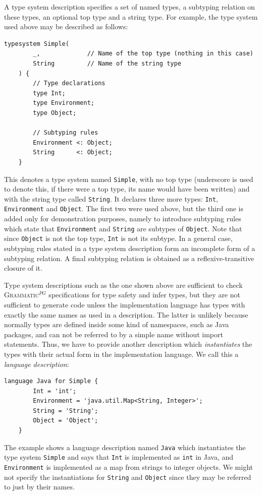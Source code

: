 \documentclass{informat} %
\newcommand{\ATF}{\textsc{Grammatic}$^{PG}$}
\begin{document}
A type system description specifies a set of named types, a subtyping relation on these types, an optional top type and a string type. For example, the type system used above may be described as follows:
\begin{lstlisting}[language=Typesystem]
	typesystem Simple( 
		_,             // Name of the top type (nothing in this case)
		String         // Name of the string type
	) {
		// Type declarations
		type Int;
		type Environment;
		type Object;

		// Subtyping rules
		Environment <: Object;
		String      <: Object;
	}
\end{lstlisting}
This denotes a type system named \texttt{Simple}, with no top type (underscore is used to denote this, if there were a top type, its name would have been written) and with the string type called \texttt{String}. It declares three more types: \texttt{Int}, \texttt{Environment} and \texttt{Object}. The first two were used above, but the third one is added only for demonstration purposes, namely to introduce subtyping rules which state that \texttt{Environment} and \texttt{String} are subtypes of \texttt{Object}. Note that since \texttt{Object} is not the top type, \texttt{Int} is not its subtype. In a general case, subtyping rules stated in a type system description form an incomplete form of a subtyping relation. A final subtyping relation is obtained as a reflexive-transitive closure of it.

Type system descriptions such as the one shown above are sufficient to check \ATF{} specifications for type safety and infer types, but they are not sufficient to generate code unless the implementation language has types with exactly the same names as used in a description. The latter is unlikely because normally types are defined inside some kind of namespaces, such as Java packages, and can not be referred to by a simple name without import statements. Thus, we have to provide another description which \emph{instantiates} the types with their actual form in the implementation language. We call this a \emph{language description}:
\begin{lstlisting}[language=Typesystem]
	language Java for Simple {
		Int = 'int';
		Environment = 'java.util.Map<String, Integer>';
		String = 'String';
		Object = 'Object';
	}
\end{lstlisting}
The example shows a language description named \texttt{Java} which instantiates the type system \texttt{Simple} and says that \texttt{Int} is implemented as \texttt{int} in Java, and \texttt{Environment} is implemented as a map from strings to integer objects. We might not specify the instantiations for \texttt{String} and \texttt{Object} since they may be referred to just by their names.
\end{document}
